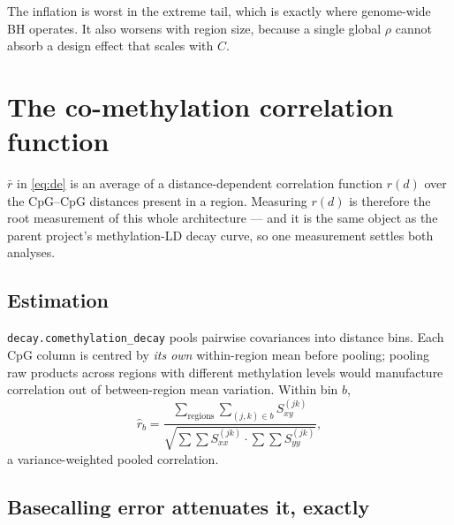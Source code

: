 \documentclass[11pt]{article}
\begin{document}
The inflation is worst in the extreme tail, which is exactly where genome-wide
BH operates. It also worsens with region size, because a single global $\rho$
cannot absorb a design effect that scales with $C$.

\section{The co-methylation correlation function}
\label{sec:decay}

$\bar r$ in \eqref{eq:de} is an average of a distance-dependent correlation
function $r(d)$ over the CpG--CpG distances present in a region. Measuring $r(d)$
is therefore the root measurement of this whole architecture --- and it is the
same object as the parent project's methylation-LD decay curve, so one
measurement settles both analyses.

\subsection{Estimation}

\texttt{decay.comethylation\_decay} pools pairwise covariances into distance
bins. Each CpG column is centred by \emph{its own} within-region mean before
pooling; pooling raw products across regions with different methylation levels
would manufacture correlation out of between-region mean variation. Within bin
$b$,
\begin{equation}
\hat r_b = \frac{\sum_{\text{regions}} \sum_{(j,k) \in b} S^{(jk)}_{xy}}
{\sqrt{\sum \sum S^{(jk)}_{xx} \cdot \sum \sum S^{(jk)}_{yy}}},
\end{equation}
a variance-weighted pooled correlation.

\subsection{Basecalling error attenuates it, exactly}
\label{sec:atten}
\end{document}
